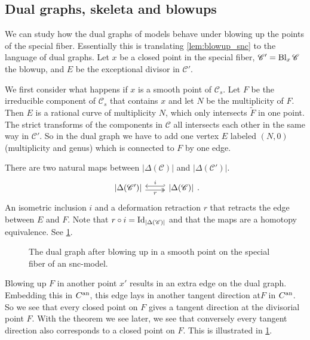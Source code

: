\subsection{Dual graphs, skeleta and blowups} \label{sec:dual_graphs_and_blowups}
We can study how the dual graphs of models behave under blowing up the points of the special fiber.
Essentially this is translating \cref{lem:blowup_snc} to the language of dual graphs.
Let $x$ be a closed point in the special fiber, $\mathscr C' = \operatorname{Bl}_{x} \mathscr C$ the blowup, and $E$ be the exceptional divisor in $\mathscr C'$.

We first consider what happens if $x $ is a smooth point of $\mathscr C_s$. 
Let $F$ be the irreducible component of $\mathscr C_s$ that contains $x$ and let $N$ be the multiplicity of $F$. 
Then $E$ is a rational curve of multiplicity $N$, which only intersects $\tilde F$ in one point. 
The strict transforms of the components in $\mathscr C$ all intersects each other in the same way in $\mathscr C'$. 
So in the dual graph we have to add one vertex $E$ labeled $(N, 0)$ (multiplicity and genus) which is connected to $F$ by one edge.

There are two natural maps between $|\Delta(\mathscr C)|$ and $|\Delta(\mathscr C')|$. 
\[
\begin{tikzcd}
	{|\Delta(\mathscr C')|} \rar[hookleftarrow, shift left]{i} \rar[twoheadrightarrow, shift right, ']{r} & {|\Delta(\mathscr C)|} 
\end{tikzcd}
.\] 
An isometric inclusion $i$ and a deformation retraction $r$ that retracts the edge between  $E$ and $F$. 
Note that $r \circ i = \operatorname{Id}_{|\Delta(\mathscr C)|}$ and that the maps are a homotopy equivalence. 
See \cref{fig:blowup_smooth_point_skeleton}. 

\begin{figure}[ht]
    \centering
    \caption{The dual graph after blowing up in a smooth point on the special fiber of an snc-model. }
    \label{fig:blowup_smooth_point_skeleton}
\end{figure}

\begin{remark}
	Blowing up $ F$ in another point $x'$ results in an extra edge on the dual graph. 
	Embedding this in $C{}^{\text{an}}$, this edge lays in another tangent direction at$F$ in $C{}^{\text{an}}$. 
	So we see that every closed point  on  $F$ gives a tangent direction at the divisorial point $F$. 
	With the theorem we see later, we see that conversely every tangent direction also corresponds to a closed point on $F$. 
	This is illustrated in \cref{fig:blowup_smooth_point_skeleton}.
\end{remark}


